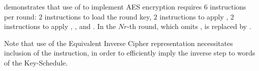 demonstrates that use of  to implement AES encryption requires
$ 6$ instructions per round:
$ 2$            
     instructions to load the round key,
$ 2$            
     instructions to apply ,
$ 2$   
     instructions to apply , , and .
In the $Nr$-th round, which omits ,
is replaced by 
     .

Note that use of the Equivalent Inverse Cipher representation
necessitates inclusion of the  instruction, in order
to efficiently imply the inverse  step to words
of the Key-Schedule.

